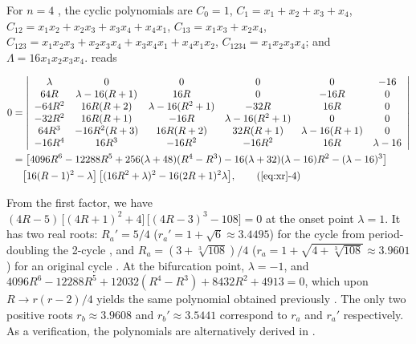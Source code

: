 \documentclass[twocolumn]{revtex4-1}
\begin{document}
For $n = 4$ \cite{brown1, stephenson, bailey, kk1, lewis},
the cyclic polynomials are
$C_0 = 1$,
$C_1 = x_1 + x_2 + x_3 + x_4$,
$C_{12} = x_1 x_2 + x_2 x_3 + x_3 x_4 + x_4 x_1$,
$C_{13} = x_1 x_3 + x_2 x_4$,
$C_{123} = x_1 x_2 x_3 + x_2 x_3 x_4 + x_3 x_4 x_1 + x_4 x_1 x_2$,
$C_{1234} = x_1 x_2 x_3 x_4$;
and
$\Lambda = 16 x_1 x_2 x_3 x_4$.
%
 reads
%
\begin{widetext}
\begin{small}
\begin{align}
0 & = \left|
\begin{array}{cccccc}
 \lambda  & 0               & 0                 & 0     & 0     & -16 \\
 64 R     & \lambda-16(R+1) & 16 R              & 0     & -16R  & 0 \\
 -64 R^2  & 16R(R+2)        & \lambda-16(R^2+1) & -32 R & 16R   & 0 \\
 -32 R^2  & 16R(R+1)        & -16R              & \lambda-16(R^2+1)  & 0 & 0 \\
 64 R^3   & -16R^2(R+3)     & 16R(R+2)        & 32 R (R+1)       & \lambda-16(R+1) & 0 \\
 -16R^4   & 16R^3           & - 16R^2           & -16R^2            & 16R & \lambda - 16
\end{array}
\right | \nonumber  \\
& =
    \big[
    4096 R^6-12288 R^5 + 256 (\lambda + 48) (R^4- R^3)
      -16 (\lambda + 32)(\lambda - 16) R^2
      -(\lambda - 16)^3 \big]  \nonumber \\
& \quad
    \big[ 16 (R-1)^2 - \lambda \big]
 \, \big[(16 R^2 + \lambda)^2 - 16 (2R+1)^2 \lambda \big],
  \tag{\ref{eq:xr}-4}
\label{eq:xr4}
\end{align}
\end{small}
\end{widetext}
%
%
%
From the first factor, we have
$ (
    4R - 5
  )
\, \big[
  (4R + 1)^2 + 4
  \big]
\, \big[
  (4R - 3)^3 - 108
  \big] =0$
at the onset point $\lambda = 1$.
%
%
%
It has two real roots:
$R_a' = 5/4$
\big($r_a' = 1+\sqrt{6} \approx 3.4495$\big)
for the cycle from period-doubling the 2-cycle
  ,
and
$R_a = (3+\sqrt[3]{108})/4$
\big($r_a = 1+\sqrt{4+\sqrt[3]{108}} \approx 3.9601$\big)
for an original cycle .
%
At the bifurcation point, $\lambda = -1$, and
$4096 R^6 - 12288 R^5 + 12032 (R^4 - R^3)
  + 8432 R^2 + 4913 = 0$,
which upon $R \rightarrow r(r-2)/4$ yields the same polynomial
obtained previously
\cite{bailey, kk1, lewis}.
%
%
%
The only two positive roots $r_b \approx 3.9608$
and $r_b' \approx 3.5441$
correspond to $r_a$ and $r_a'$ respectively.
%
As a verification, the polynomials are
alternatively derived in .
\end{document}
